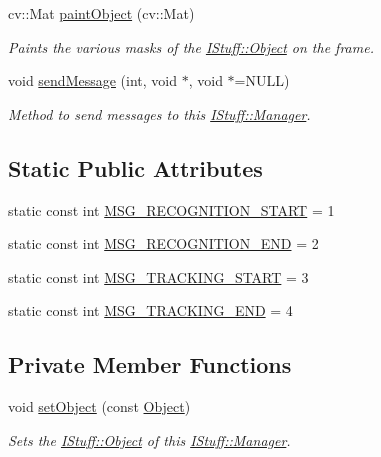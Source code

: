 \begin{DoxyCompactItemize}
cv\-::\-Mat \hyperlink{class_i_stuff_1_1_manager_a5cc4e8151aa21b873786eb8c0742c3d5}{paint\-Object} (cv\-::\-Mat)
\begin{DoxyCompactList}\small\item\em Paints the various masks of the \hyperlink{class_i_stuff_1_1_object}{I\-Stuff\-::\-Object} on the frame. \end{DoxyCompactList}\item 
void \hyperlink{class_i_stuff_1_1_manager_adaef1575710c20ad769c23bb55d2144c}{send\-Message} (int, void $\ast$, void $\ast$=N\-U\-L\-L)
\begin{DoxyCompactList}\small\item\em Method to send messages to this \hyperlink{class_i_stuff_1_1_manager}{I\-Stuff\-::\-Manager}. \end{DoxyCompactList}\end{DoxyCompactItemize}
\subsection*{Static Public Attributes}
\begin{DoxyCompactItemize}
\item 
static const int \hyperlink{class_i_stuff_1_1_manager_af7f9a2cc3c53b7cf351a12f179230da7}{M\-S\-G\-\_\-\-R\-E\-C\-O\-G\-N\-I\-T\-I\-O\-N\-\_\-\-S\-T\-A\-R\-T} = 1
\item 
static const int \hyperlink{class_i_stuff_1_1_manager_a4c465ff50b8eddde0e5fd8b4d3e37bbc}{M\-S\-G\-\_\-\-R\-E\-C\-O\-G\-N\-I\-T\-I\-O\-N\-\_\-\-E\-N\-D} = 2
\item 
static const int \hyperlink{class_i_stuff_1_1_manager_a46dc3e50421b203bab7941bcc6e29604}{M\-S\-G\-\_\-\-T\-R\-A\-C\-K\-I\-N\-G\-\_\-\-S\-T\-A\-R\-T} = 3
\item 
static const int \hyperlink{class_i_stuff_1_1_manager_a841fb5e820b9aa16aa8d7862362fa50b}{M\-S\-G\-\_\-\-T\-R\-A\-C\-K\-I\-N\-G\-\_\-\-E\-N\-D} = 4
\end{DoxyCompactItemize}
\subsection*{Private Member Functions}
\begin{DoxyCompactItemize}
\item 
void \hyperlink{class_i_stuff_1_1_manager_a3cc212bd05afe4bdffada9dd35994c61}{set\-Object} (const \hyperlink{class_i_stuff_1_1_object}{Object})
\begin{DoxyCompactList}\small\item\em Sets the \hyperlink{class_i_stuff_1_1_object}{I\-Stuff\-::\-Object} of this \hyperlink{class_i_stuff_1_1_manager}{I\-Stuff\-::\-Manager}. \end{DoxyCompactList}\end{DoxyCompactItemize}
